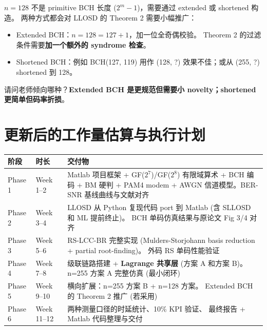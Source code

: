 \documentclass[11pt,a4paper]{article}
\begin{document}
\begin{actionbox}[title=\textbf{Q9. n=128 用 Extended BCH 还是 Shortened BCH}]
$n=128$ 不是 primitive BCH 长度 ($2^m - 1$)，需要通过 extended 或 shortened 构造。
两种方式都会对 LLOSD 的 Theorem 2 需要小幅推广：

\begin{itemize}[leftmargin=1em, itemsep=1pt, topsep=2pt]
\item Extended BCH：$n = 128 = 127 + 1$，加一位全奇偶校验。
Theorem 2 的过滤条件需要\textbf{加一个额外的 syndrome 检查}。
\item Shortened BCH：例如 BCH(127, 119) 用作 (128, ?) 效果不佳；或从 (255, ?) shortened 到 128。
\end{itemize}

请问老师倾向哪种？\textbf{Extended BCH 是更规范但需要小 novelty；shortened 更简单但码率折损}。
\end{actionbox}

\section{更新后的工作量估算与执行计划}

\begin{table}[!ht]
\centering
\begin{tabularx}{\textwidth}{llX}
\toprule
\textbf{阶段} & \textbf{时长} & \textbf{交付物} \\
\midrule
Phase 1 & Week 1--2 &
Matlab 项目框架 + GF($2^7$)/GF($2^8$) 有限域算术 + BCH 编码
+ BM 硬判 + PAM4 modem + AWGN 信道模型。BER-SNR 基线曲线与文献对齐 \\
\midrule
Phase 2 & Week 3--4 &
LLOSD 从 Python 复现代码 port 到 Matlab (含 SLLOSD 和 ML 提前终止)。
BCH 单码仿真结果与原论文 Fig 3/4 对齐 \\
\midrule
Phase 3 & Week 5--6 &
RS-LCC-BR 完整实现 (Mulders-Storjohann basis reduction + partial root-finding)。
外码 RS 单码性能验证 \\
\midrule
Phase 4 & Week 7--8 &
级联链路搭建 + \textbf{Lagrange 共享层} (方案 A 和方案 B)。
n=255 方案 A 完整仿真 (最小闭环) \\
\midrule
Phase 5 & Week 9--10 &
横向扩展：n=255 方案 B + n=128 方案。
Extended BCH 的 Theorem 2 推广 (若采用) \\
\midrule
Phase 6 & Week 11--12 &
两种测量口径的时延统计、10\% KPI 验证、
最终报告 + Matlab 代码整理与交付 \\
\bottomrule
\end{tabularx}
\end{table}
\end{document}
